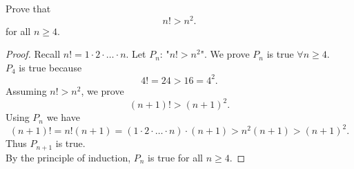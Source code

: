 \documentclass[math1010-lecture-notes]{subfiles}
\begin{document}
\begin{example}
  Prove that \[
  n! > n^2
  .\] for all $n\ge 4$.
\end{example}
\begin{proof}[Proof]
  Recall $n! = 1\cdot 2\cdot \ldots\cdot n$. Let $P_n$: "$n! > n^2$". We prove $P_n$ is true
  $\forall n\ge 4$.\\
  $P_4$ is true because  \[
  4! = 24 > 16 = 4^2
  .\] Assuming $n! > n^2$, we prove \[
  \left( n+1 \right)! > \left( n+1 \right) ^2
  .\] Using $P_n$ we have  \[
  \left( n+1 \right)! = n!\left( n+1 \right) = \left( 1\cdot 2\cdot \ldots\cdot n \right) \cdot \left( n+1 \right) > n^2(n+1) > \left( n+1
  \right) ^2
.\] Thus $P_{n+1}$ is true. \\
By the principle of induction, $P_n$ is true for all  $n\ge 4$.
\end{proof}
\end{document}
